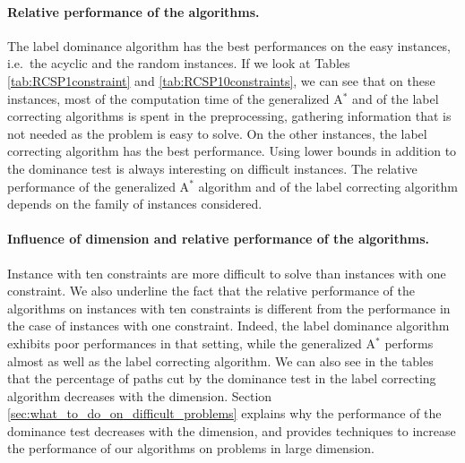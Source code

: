 \documentclass[11pt]{amsart}
\theoremstyle{plain}
\theoremstyle{remark}
\begin{document}
\paragraph{Relative performance of the algorithms.} The label dominance algorithm has the best performances on the easy instances, i.e.~the acyclic and the random instances. If we look at Tables \ref{tab:RCSP1constraint} and \ref{tab:RCSP10constraints}, we can see that on these instances, most of the computation time of the generalized A$^{*}$ and of the label correcting algorithms is spent in the preprocessing, gathering information that is not needed as the problem is easy to solve. On the other instances, the label correcting algorithm has the best performance. Using lower bounds in addition to the dominance test is always interesting on difficult instances. The relative performance of the generalized A$^{*}$ algorithm and of the label correcting algorithm depends on the family of instances considered.

\paragraph{Influence of dimension and relative performance of the algorithms.} Instance with ten constraints are more difficult to solve than instances with one constraint. We also underline the fact that the relative performance of the algorithms on instances with ten constraints is different from the performance in the case of instances with one constraint. Indeed, the label dominance algorithm exhibits poor performances in that setting, while the generalized A$^{*}$ performs almost as well as the label correcting algorithm. We can also see in the tables that the percentage of paths cut by the dominance test in the label correcting algorithm decreases with the dimension. Section \ref{sec:what_to_do_on_difficult_problems} explains why the performance of the dominance test decreases with the dimension, and provides techniques to increase the performance of our algorithms on problems in large dimension. 
\end{document}
